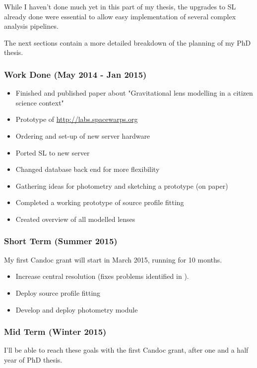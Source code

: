 \documentclass[11pt]{article}
\begin{document}
While I haven't done much yet in this part of my thesis, the upgrades to SL already done were essential to allow easy implementation of several complex analysis pipelines.


The next sections contain a more detailed breakdown of the planning of my PhD thesis.


\subsubsection{Work Done (May 2014 - Jan 2015)} \label{sec:plan_done}

\begin{itemize}
  \item Finished and published paper about "Gravitational lens modelling in a citizen science context" \cite{spaghetti}
  \item Prototype of \url{http://labs.spacewarps.org}
  \item Ordering and set-up of new server hardware
  \item Ported SL to new server
  \item Changed database back end for more flexibility
  \item Gathering ideas for photometry and sketching a prototype (on paper)
  \item Completed a working prototype of source profile fitting
  \item Created overview of all modelled lenses
\end{itemize}



\subsubsection{Short Term (Summer 2015)} \label{sec:plan_short}
My first Candoc grant will start in March 2015, running for 10 months.

\begin{itemize}
  \item Increase central resolution (fixes problems identified in \cite{spaghetti}).
  \item Deploy source profile fitting
  \item Develop and deploy photometry module
\end{itemize}



\subsubsection{Mid Term (Winter 2015)} \label{sec:plan_mid}
I'll be able to reach these goals with the first Candoc grant, after one and a half year of PhD thesis.
\end{document}
